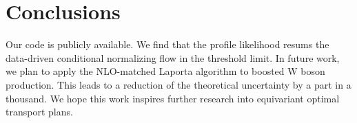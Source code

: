 \section{Conclusions}\label{sec:conclusions}

Our code is publicly available. We find that the profile likelihood
resums the data-driven conditional normalizing flow in the threshold
limit. In future work, we plan to apply the NLO-matched Laporta
algorithm to boosted W boson production. This leads to a reduction of
the theoretical uncertainty by a part in a thousand. We hope this work
inspires further research into equivariant optimal transport plans.

